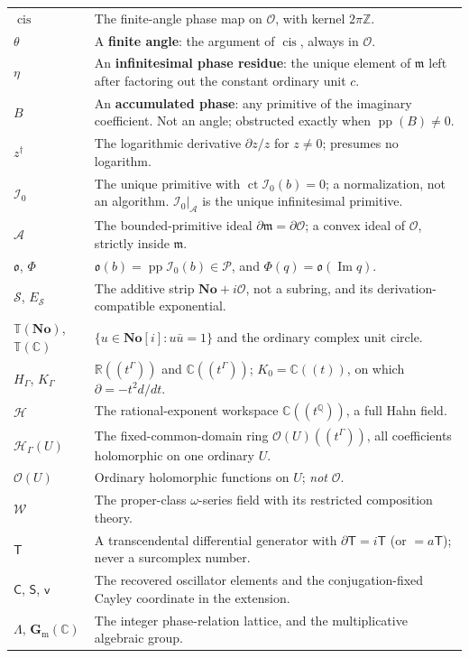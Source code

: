 \documentclass[11pt,letterpaper]{article}
\numberwithin{equation}{section}
\theoremstyle{definition}
\theoremstyle{remark}
\newcommand{\No}{\mathbf{No}}
\newcommand{\SC}{\mathbf{No}[i]}
\newcommand{\R}{\mathbb R}
\newcommand{\C}{\mathbb C}
\newcommand{\Q}{\mathbb Q}
\newcommand{\Z}{\mathbb Z}
\newcommand{\der}{\partial}
\newcommand{\Ofin}{\mathcal O}
\newcommand{\mm}{\mathfrak m}
\newcommand{\Pcl}{\mathcal P}
\newcommand{\Acl}{\mathcal A}
\newcommand{\Izero}{\mathcal I_{0}}
\newcommand{\Obs}{\mathfrak o}
\newcommand{\pp}{\operatorname{pp}}
\newcommand{\ct}{\operatorname{ct}}
\newcommand{\Imm}{\operatorname{Im}}
\newcommand{\cis}{\operatorname{cis}}
\newcommand{\Tor}{\mathbb T}
\newcommand{\Strip}{\mathcal S}
\newcommand{\Estrip}{E_{\Strip}}
\newcommand{\Hring}{\mathscr H}
\newcommand{\Hol}{\mathscr O}
\newcommand{\gm}{\mathbf G_{\mathrm m}}
\begin{document}
\begin{longtable}{@{}L{0.17\textwidth}L{0.76\textwidth}@{}}
$\cis$ & The finite-angle phase map on $\Ofin$, with kernel $2\pi\Z$. \\
$\theta$ & A \textbf{finite angle}: the argument of $\cis$, always in
$\Ofin$. \\
$\eta$ & An \textbf{infinitesimal phase residue}: the unique element of $\mm$
left after factoring out the constant ordinary unit $c$. \\
$B$ & An \textbf{accumulated phase}: any primitive of the imaginary
coefficient. Not an angle; obstructed exactly when $\pp(B)\neq0$. \\
$z^{\dagger}$ & The logarithmic derivative $\der z/z$ for $z\neq0$; presumes
no logarithm. \\
$\Izero$ & The unique primitive with $\ct\Izero(b)=0$; a normalization, not
an algorithm. $\Izero|_{\Acl}$ is the unique infinitesimal primitive. \\
$\Acl$ & The bounded-primitive ideal $\der\mm=\der\Ofin$; a convex ideal of
$\Ofin$, strictly inside $\mm$. \\
$\Obs$, $\Phi$ & $\Obs(b)=\pp\Izero(b)\in\Pcl$, and
$\Phi(q)=\Obs(\Imm q)$. \\
$\Strip$, $\Estrip$ & The additive strip $\No+i\Ofin$, not a subring, and its
derivation-compatible exponential. \\
$\Tor(\No)$, $\Tor(\C)$ & $\{u\in\SC:u\bar u=1\}$ and the ordinary complex
unit circle. \\
$H_{\Gamma}$, $K_{\Gamma}$ & $\R((t^{\Gamma}))$ and $\C((t^{\Gamma}))$;
$K_{0}=\C((t))$, on which $\der=-t^{2}d/dt$. \\
$\Hring$ & The rational-exponent workspace $\C((t^{\Q}))$, a full Hahn field.
\\
$\Hring_{\Gamma}(U)$ & The fixed-common-domain ring
$\Hol(U)((t^{\Gamma}))$, all coefficients holomorphic on one ordinary
$U$. \\
$\Hol(U)$ & Ordinary holomorphic functions on $U$; \emph{not} $\Ofin$. \\
$\mathscr W$ & The proper-class $\omega$-series field with its restricted
composition theory. \\
$\mathsf T$ & A transcendental differential generator with
$\der\mathsf T=i\mathsf T$ (or $=a\mathsf T$); never a surcomplex number. \\
$\mathsf C$, $\mathsf S$, $\mathsf v$ & The recovered oscillator elements and
the conjugation-fixed Cayley coordinate in the extension. \\
$\Lambda$, $\gm(\C)$ & The integer phase-relation lattice, and the
multiplicative algebraic group. \\

\end{longtable}
\end{document}
